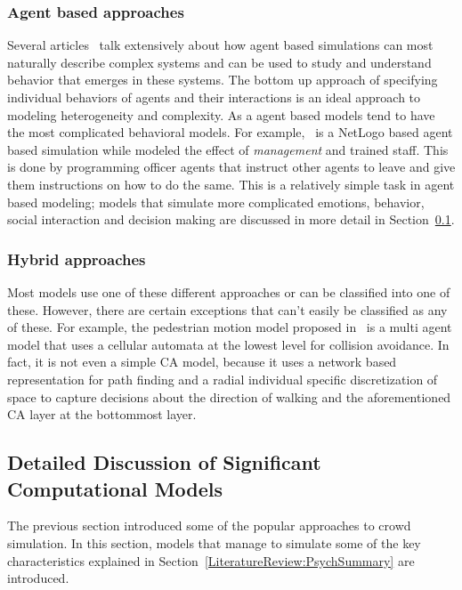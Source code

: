 \subsubsection{Agent based approaches}
Several articles~\cite{Epstein:1999vn,Bonabeau:2002um,Li:2008wt} talk extensively about how agent based simulations can most naturally describe complex systems and can be used to study and understand behavior that emerges in these systems. The bottom up approach of specifying individual behaviors of agents and their interactions is an ideal approach to modeling heterogeneity and complexity. As a agent based models tend to have the most complicated behavioral models. For example,~\cite{AugustijnBeckers:2010cr} is a NetLogo based agent based simulation while modeled the effect of \emph{management} and trained staff. This is done by programming officer agents that instruct other agents to leave and give them instructions on how to do the same. This is a relatively simple task in agent based modeling; models that simulate more complicated emotions, behavior, social interaction and decision making are discussed in more detail in Section~\ref{LiteratureReview:DetailedModels}.

\subsubsection{Hybrid approaches}
Most models use one of these different approaches or can be classified into one of these. However, there are certain exceptions that can't easily be classified as any of these. For example, the pedestrian motion model proposed in~\cite{Bierlaire:2003uj} is a multi agent model that uses a cellular automata at the lowest level for collision avoidance. In fact, it is not even a simple CA model, because it uses a network based representation for path finding and a radial individual specific discretization of space to capture decisions about the direction of walking and the aforementioned CA layer at the bottommost layer.

\subsection{Detailed Discussion of Significant Computational Models}
\label{LiteratureReview:DetailedModels}

The previous section introduced some of the popular approaches to crowd simulation. In this section, models that manage to simulate some of the key characteristics explained in Section~\ref{LiteratureReview:PsychSummary} are introduced.

